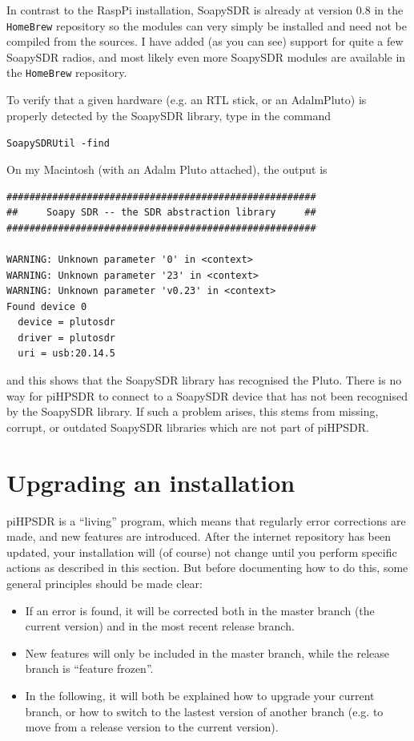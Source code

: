 \documentclass[12pt]{book}
\def\grtt#1{\texttt{\color{magenta}#1}}
\def\pH{pi\-HPSDR\xspace}
\begin{document}
In contrast to the RaspPi
installation, SoapySDR is already at version 0.8 in the \texttt{HomeBrew} repository so
the modules can very simply be installed and need not be compiled from the sources.
I have added (as you can see) support for quite a few SoapySDR radios, and most
likely even more SoapySDR modules are available in the \texttt{HomeBrew} repository.

\clearpage
To verify that a given hardware (e.g. an RTL stick, or an AdalmPluto) is properly detected by the
SoapySDR library, type in the command

\grtt{SoapySDRUtil -find}

On my Macintosh (with an Adalm Pluto attached), the output is

\begin{small}
\begin{verbatim}
######################################################
##     Soapy SDR -- the SDR abstraction library     ##
######################################################

WARNING: Unknown parameter '0' in <context>
WARNING: Unknown parameter '23' in <context>
WARNING: Unknown parameter 'v0.23' in <context>
Found device 0
  device = plutosdr
  driver = plutosdr
  uri = usb:20.14.5
\end{verbatim}
\end{small}

and this shows that the SoapySDR library has recognised the Pluto.
There is no way for \pH to connect
to a SoapySDR device that has not been recognised by the SoapySDR library. If such a problem arises, this
stems from missing, corrupt, or outdated SoapySDR libraries which are not part of \pH.

\section{Upgrading an installation}
\pH is a ``living'' program, which means that regularly  error corrections are made, and new features are
introduced. After the internet repository has been updated, your installation will (of course) not change
until you perform specific actions as described in this section. But before documenting how to do this,
some general principles should be made clear:

\begin{itemize}
\item{If an error is found, it will be corrected both in the master branch (the current version) and in the
most recent release branch.}
\item{New features will only be included in the master branch, while the release branch is ``feature frozen''.}
\item{In the following, it will both be explained how to upgrade your current branch, or how to
switch to the lastest version of  another branch (e.g. to move from a release version to the current version).}
\end{itemize}
\end{document}
